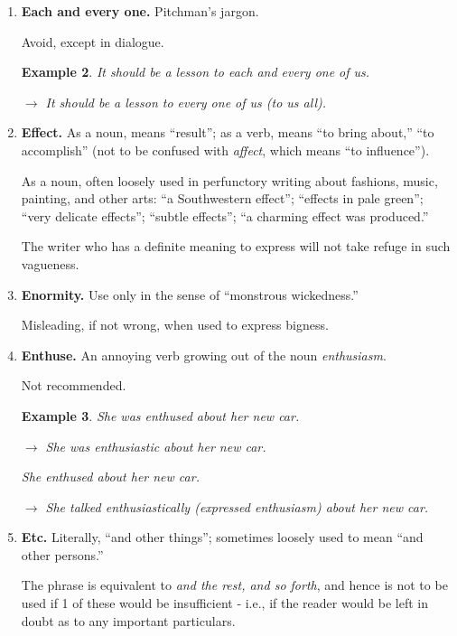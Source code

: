 \documentclass{book}
\numberwithin{equation}{section}
\newtheorem{example}{Example}[chapter]
\begin{document}
\begin{enumerate}
\begin{example}
        $\to$ He lost the 1st game because of carelessness.
    \end{example}
    In correct use, synonymous with \textit{attributable to}: ``The accident was due to bad weather''; ``losses due to preventable fires.''
    \item \textbf{Each and every one.} Pitchman's jargon.
    
    Avoid, except in dialogue.
    \begin{example}
        It should be a lesson to each and every one of us.
        
        $\to$ It should be a lesson to every one of us (to us all).
    \end{example}
    \item \textbf{Effect.} As a noun, means ``result''; as a verb, means ``to bring about,'' ``to accomplish'' (not to be confused with \textit{affect}, which means ``to influence'').
    
    As a noun, often loosely used in perfunctory writing about fashions, music, painting, and other arts: ``a Southwestern effect''; ``effects in pale green''; ``very delicate effects''; ``subtle effects''; ``a charming effect was produced.''
    
    The writer who has a definite meaning to express will not take refuge in such vagueness.
    \item \textbf{Enormity.} Use only in the sense of ``monstrous wickedness.''
    
    Misleading, if not wrong, when used to express bigness.
    \item \textbf{Enthuse.} An annoying verb growing out of the noun \textit{enthusiasm}.
    
    Not recommended.
    \begin{example}
        She was enthused about her new car.
        
        $\to$ She was enthusiastic about her new car.
        
        She enthused about her new car.
        
        $\to$ She talked enthusiastically (expressed enthusiasm) about her new car.
    \end{example}
    \item \textbf{Etc.} Literally, ``and other things''; sometimes loosely used to mean ``and other persons.''
    
    The phrase is equivalent to \textit{and the rest, and so forth}, and hence is not to be used if 1 of these would be insufficient - i.e., if the reader would be left in doubt as to any important particulars.
    

\end{enumerate}
\end{document}
